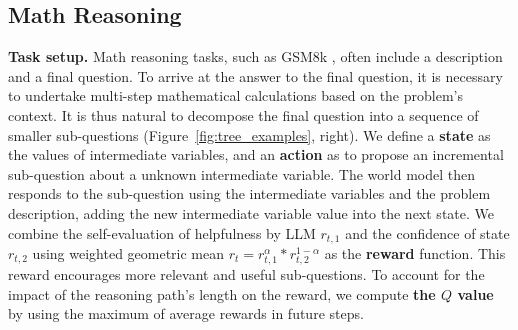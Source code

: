 \subsection{Math Reasoning} \label{sec:math}


\noindent \textbf{Task setup.}
Math reasoning tasks, such as GSM8k \cite{cobbe2021training}, often include a description and a final question.
To arrive at the answer to the final question, it is necessary to undertake multi-step mathematical calculations 
based on the problem's context.
It is thus natural to decompose the final question into a sequence of smaller sub-questions (Figure~\ref{fig:tree_examples}, right).
We define a \textbf{state} as the values of intermediate variables,
and an \textbf{action} as to propose an incremental sub-question about a unknown intermediate variable.
The world model then responds to the sub-question using the intermediate variables and the problem description, adding the new intermediate variable value into the next state.
We combine the self-evaluation of helpfulness by LLM $r_{t, 1}$ and the confidence of state $r_{t, 2}$ using weighted geometric mean $r_t = r_{t, 1}^\alpha * r_{t, 2}^{1 - \alpha}$ as the \textbf{reward} function.
This reward encourages more relevant and useful sub-questions.
To account for the impact of the reasoning path's length on the reward, we compute \textbf{the $Q$ value} by using the maximum of average rewards in future steps.

